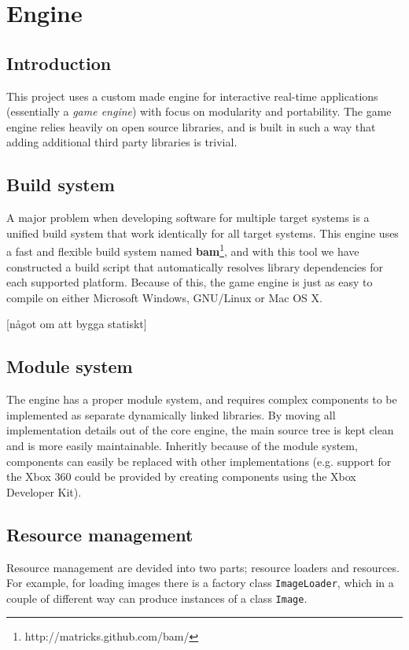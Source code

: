 
\chapter{Engine}
\section {Introduction}
This project uses a custom made engine for interactive real-time applications (essentially a \textit{game engine}) with focus on modularity and portability. The game engine relies heavily on open source libraries, and is built in such a way that adding additional third party libraries is trivial.

\section {Build system}
A major problem when developing software for multiple target systems is a unified build system that work
identically for all target systems. This engine uses a fast and flexible build system named \textbf{bam}\footnote{http://matricks.github.com/bam/}, and
with this tool we have constructed a build script that automatically resolves library dependencies for each supported platform. Because of this, the game engine is just as easy to compile on either Microsoft Windows, GNU/Linux or Mac OS X.

[något om att bygga statiskt]

\section{Module system}
The engine has a proper module system, and requires complex components to be implemented as separate dynamically linked libraries. By moving all implementation details out of the core engine, the main source tree is kept clean and is more easily maintainable. Inheritly because of the module system, components can easily be replaced with other implementations (e.g. support for the Xbox 360 could be provided
by creating components using the Xbox Developer Kit).

\section{Resource management}
Resource management are devided into two parts; resource loaders and resources. For example, for loading images
there is a factory class \texttt{ImageLoader}, which in a couple of different way can produce instances of a class \texttt{Image}.

